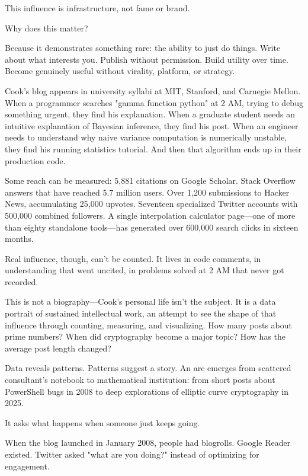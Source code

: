 This influence is infrastructure, not fame or brand.

\bigskip

Why does this matter?

Because it demonstrates something rare: the ability to just do things. Write about what interests you. Publish without permission. Build utility over time. Become genuinely useful without virality, platform, or strategy.

Cook's blog appears in university syllabi at MIT, Stanford, and Carnegie Mellon. When a programmer searches "gamma function python" at 2 AM, trying to debug something urgent, they find his explanation. When a graduate student needs an intuitive explanation of Bayesian inference, they find his post. When an engineer needs to understand why naive variance computation is numerically unstable, they find his running statistics tutorial. And then that algorithm ends up in their production code.

Some reach can be measured: 5,881 citations on Google Scholar. Stack Overflow answers that have reached 5.7 million users. Over 1,200 submissions to Hacker News, accumulating 25,000 upvotes. Seventeen specialized Twitter accounts with 500,000 combined followers. A single interpolation calculator page---one of more than eighty standalone tools---has generated over 600,000 search clicks in sixteen months.

Real influence, though, can't be counted. It lives in code comments, in understanding that went uncited, in problems solved at 2 AM that never got recorded.

\bigskip

This is not a biography---Cook's personal life isn't the subject. It is a data portrait of sustained intellectual work, an attempt to see the shape of that influence through counting, measuring, and visualizing. How many posts about prime numbers? When did cryptography become a major topic? How has the average post length changed?

Data reveals patterns. Patterns suggest a story. An arc emerges from scattered consultant's notebook to mathematical institution: from short posts about PowerShell bugs in 2008 to deep explorations of elliptic curve cryptography in 2025.

It asks what happens when someone just keeps going.

\bigskip

When the blog launched in January 2008, people had blogrolls. Google Reader existed. Twitter asked "what are you doing?" instead of optimizing for engagement.

